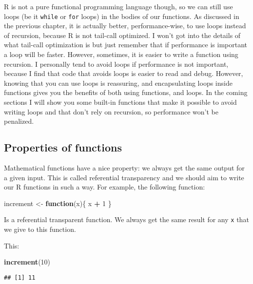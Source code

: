 \documentclass[
]{article}
\newenvironment{Shaded}{\begin{snugshade}}{\end{snugshade}}
\newcommand{\ControlFlowTok}[1]{\textcolor[rgb]{0.13,0.29,0.53}{\textbf{#1}}}
\newcommand{\DecValTok}[1]{\textcolor[rgb]{0.00,0.00,0.81}{#1}}
\newcommand{\KeywordTok}[1]{\textcolor[rgb]{0.13,0.29,0.53}{\textbf{#1}}}
\newcommand{\NormalTok}[1]{#1}
\newcommand{\OperatorTok}[1]{\textcolor[rgb]{0.81,0.36,0.00}{\textbf{#1}}}
\newcommand{\StringTok}[1]{\textcolor[rgb]{0.31,0.60,0.02}{#1}}
\begin{document}
R is not a pure functional programming language though, so we can still use loops (be it \texttt{while} or
\texttt{for} loops) in the bodies of our functions. As discussed in the previous chapter, it is actually
better, performance-wise, to use loops instead of recursion, because R is not tail-call optimized.
I won't got into the details of what tail-call optimization is but just remember that if
performance is important a loop will be faster. However, sometimes, it is easier to write a
function using recursion. I personally tend to avoid loops if performance is not important,
because I find that code that avoids loops is easier to read and debug. However, knowing that
you can use loops is reassuring, and encapsulating loops inside functions gives you the benefits of
both using functions, and loops. In the coming sections I will show you some built-in functions
that make it possible to avoid writing loops and that don't rely on recursion, so performance
won't be penalized.

\hypertarget{properties-of-functions}{%
\subsection{Properties of functions}\label{properties-of-functions}}

Mathematical functions have a nice property: we always get the same output for a given input. This
is called referential transparency and we should aim to write our R functions in such a way.
For example, the following function:

\begin{Shaded}
\begin{Highlighting}[]
\NormalTok{increment \textless{}{-}}\StringTok{ }\ControlFlowTok{function}\NormalTok{(x)\{}
\NormalTok{    x }\OperatorTok{+}\StringTok{ }\DecValTok{1}
\NormalTok{\}}
\end{Highlighting}
\end{Shaded}

Is a referential transparent function. We always get the same result for any \texttt{x} that we give to
this function.

This:

\begin{Shaded}
\begin{Highlighting}[]
\KeywordTok{increment}\NormalTok{(}\DecValTok{10}\NormalTok{)}
\end{Highlighting}
\end{Shaded}

\begin{verbatim}
## [1] 11
\end{verbatim}
\end{document}
